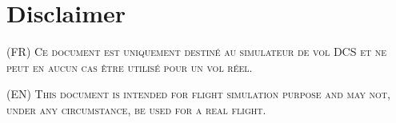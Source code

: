 \thispagestyle{default}




\section*{Disclaimer}

\vfill

{\Huge%

    \begin{doublespacing}%
        \textsc{(FR) Ce document est uniquement destiné au simulateur de vol DCS et ne peut en aucun cas être utilisé pour un vol réel.}%
    \end{doublespacing}%
    
\vspace{4cm}

    \begin{doublespacing}%
        \textsc{(EN) This document is intended for flight simulation purpose and may not, under any circumstance, be used for a real flight.}%
    \end{doublespacing}%

}

\vfill

